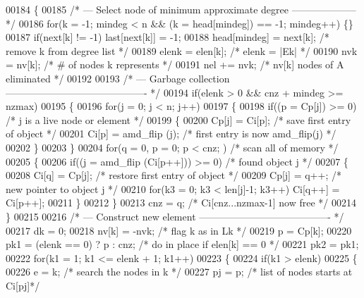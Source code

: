 \begin{DoxyCode}
00184   \{
00185     \textcolor{comment}{/* --- Select node of minimum approximate degree -------------------- */}
00186     \textcolor{keywordflow}{for}(k = -1; mindeg < n && (k = head[mindeg]) == -1; mindeg++) \{\}
00187     \textcolor{keywordflow}{if}(next[k] != -1) last[next[k]] = -1;
00188     head[mindeg] = next[k];          \textcolor{comment}{/* remove k from degree list */}
00189     elenk = elen[k];                  \textcolor{comment}{/* elenk = |Ek| */}
00190     nvk = nv[k];                      \textcolor{comment}{/* # of nodes k represents */}
00191     nel += nvk;                        \textcolor{comment}{/* nv[k] nodes of A eliminated */}
00192     
00193     \textcolor{comment}{/* --- Garbage collection ------------------------------------------- */}
00194     \textcolor{keywordflow}{if}(elenk > 0 && cnz + mindeg >= nzmax)
00195     \{
00196       \textcolor{keywordflow}{for}(j = 0; j < n; j++)
00197       \{
00198         \textcolor{keywordflow}{if}((p = Cp[j]) >= 0)      \textcolor{comment}{/* j is a live node or element */}
00199         \{
00200           Cp[j] = Ci[p];          \textcolor{comment}{/* save first entry of object */}
00201           Ci[p] = amd\_flip (j);    \textcolor{comment}{/* first entry is now amd\_flip(j) */}
00202         \}
00203       \}
00204       \textcolor{keywordflow}{for}(q = 0, p = 0; p < cnz; ) \textcolor{comment}{/* scan all of memory */}
00205       \{
00206         \textcolor{keywordflow}{if}((j = amd\_flip (Ci[p++])) >= 0)  \textcolor{comment}{/* found object j */}
00207         \{
00208           Ci[q] = Cp[j];       \textcolor{comment}{/* restore first entry of object */}
00209           Cp[j] = q++;          \textcolor{comment}{/* new pointer to object j */}
00210           \textcolor{keywordflow}{for}(k3 = 0; k3 < len[j]-1; k3++) Ci[q++] = Ci[p++];
00211         \}
00212       \}
00213       cnz = q;                       \textcolor{comment}{/* Ci[cnz...nzmax-1] now free */}
00214     \}
00215     
00216     \textcolor{comment}{/* --- Construct new element ---------------------------------------- */}
00217     dk = 0;
00218     nv[k] = -nvk;                     \textcolor{comment}{/* flag k as in Lk */}
00219     p = Cp[k];
00220     pk1 = (elenk == 0) ? p : cnz;      \textcolor{comment}{/* do in place if elen[k] == 0 */}
00221     pk2 = pk1;
00222     \textcolor{keywordflow}{for}(k1 = 1; k1 <= elenk + 1; k1++)
00223     \{
00224       \textcolor{keywordflow}{if}(k1 > elenk)
00225       \{
00226         e = k;                     \textcolor{comment}{/* search the nodes in k */}
00227         pj = p;                    \textcolor{comment}{/* list of nodes starts at Ci[pj]*/}

\end{DoxyCode}
